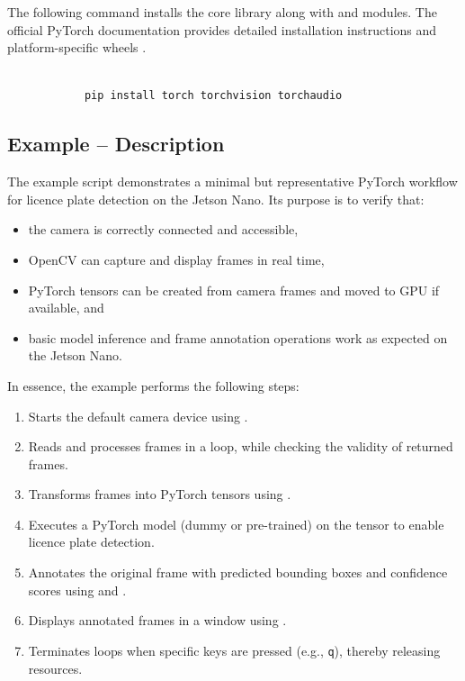 The following command installs the core  library along with  and  modules. The official PyTorch documentation provides detailed installation instructions and platform-specific wheels \cite{paszke2019pytorch, pytorchdocs}.


\begin{tcolorbox}[colback=white,colframe=black,coltext= ShellColor, sharp corners, boxrule=0.8pt]
	\begin{small}
		\begin{verbatim}
			
			pip install torch torchvision torchaudio	\end{verbatim}
	\end{small}
\end{tcolorbox}




\subsection{Example -- Description}

The example script  demonstrates a minimal but representative PyTorch workflow for licence plate detection on the Jetson Nano. Its purpose is to verify that:
\begin{itemize}
	\item the camera is correctly connected and accessible,
	\item OpenCV can capture and display frames in real time,
	\item PyTorch tensors can be created from camera frames and moved to GPU if available, and
	\item basic model inference and frame annotation operations work as expected on the Jetson Nano.
\end{itemize}

In essence, the example performs the following steps:
\begin{enumerate}
	\item Starts the default camera device using .
	\item Reads and processes frames in a loop, while checking the validity of returned frames.
	\item Transforms frames into PyTorch tensors using .
	\item Executes a PyTorch model (dummy or pre-trained) on the tensor to enable licence plate detection.
	\item Annotates the original frame with predicted bounding boxes and confidence scores using  and .
	\item Displays annotated frames in a window using .
	\item Terminates loops when specific keys are pressed (e.g., \texttt{q}), thereby releasing resources.
\end{enumerate}
